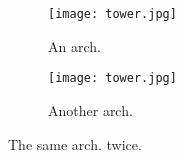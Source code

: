 \documentclass{article}
\begin{document}
	\begin{figure}[h!]
		\centering
		\begin{subfigure}[b]{0.4\linewidth}
			
			\texttt{[image: tower.jpg]}
			\caption{An arch.}
		\end{subfigure}
	\begin{subfigure}[b]{0.4\linewidth}
		
		\texttt{[image: tower.jpg]}
		\caption{Another arch.}
	\end{subfigure}
\caption{The same arch. twice.}
\label{fig:tower}
	\end{figure}
\end{document}

